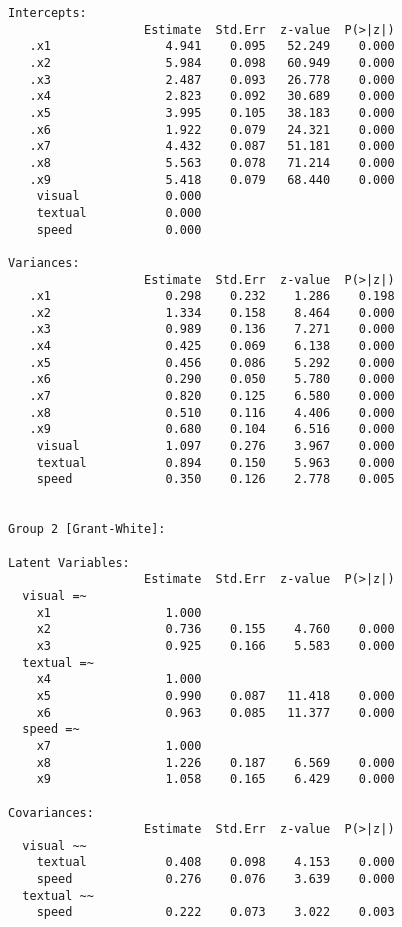 \begin{verbatim}
Intercepts:
                   Estimate  Std.Err  z-value  P(>|z|)
   .x1                4.941    0.095   52.249    0.000
   .x2                5.984    0.098   60.949    0.000
   .x3                2.487    0.093   26.778    0.000
   .x4                2.823    0.092   30.689    0.000
   .x5                3.995    0.105   38.183    0.000
   .x6                1.922    0.079   24.321    0.000
   .x7                4.432    0.087   51.181    0.000
   .x8                5.563    0.078   71.214    0.000
   .x9                5.418    0.079   68.440    0.000
    visual            0.000                           
    textual           0.000                           
    speed             0.000                           

Variances:
                   Estimate  Std.Err  z-value  P(>|z|)
   .x1                0.298    0.232    1.286    0.198
   .x2                1.334    0.158    8.464    0.000
   .x3                0.989    0.136    7.271    0.000
   .x4                0.425    0.069    6.138    0.000
   .x5                0.456    0.086    5.292    0.000
   .x6                0.290    0.050    5.780    0.000
   .x7                0.820    0.125    6.580    0.000
   .x8                0.510    0.116    4.406    0.000
   .x9                0.680    0.104    6.516    0.000
    visual            1.097    0.276    3.967    0.000
    textual           0.894    0.150    5.963    0.000
    speed             0.350    0.126    2.778    0.005


Group 2 [Grant-White]:

Latent Variables:
                   Estimate  Std.Err  z-value  P(>|z|)
  visual =~                                           
    x1                1.000                           
    x2                0.736    0.155    4.760    0.000
    x3                0.925    0.166    5.583    0.000
  textual =~                                          
    x4                1.000                           
    x5                0.990    0.087   11.418    0.000
    x6                0.963    0.085   11.377    0.000
  speed =~                                            
    x7                1.000                           
    x8                1.226    0.187    6.569    0.000
    x9                1.058    0.165    6.429    0.000

Covariances:
                   Estimate  Std.Err  z-value  P(>|z|)
  visual ~~                                           
    textual           0.408    0.098    4.153    0.000
    speed             0.276    0.076    3.639    0.000
  textual ~~                                          
    speed             0.222    0.073    3.022    0.003


\end{verbatim}
